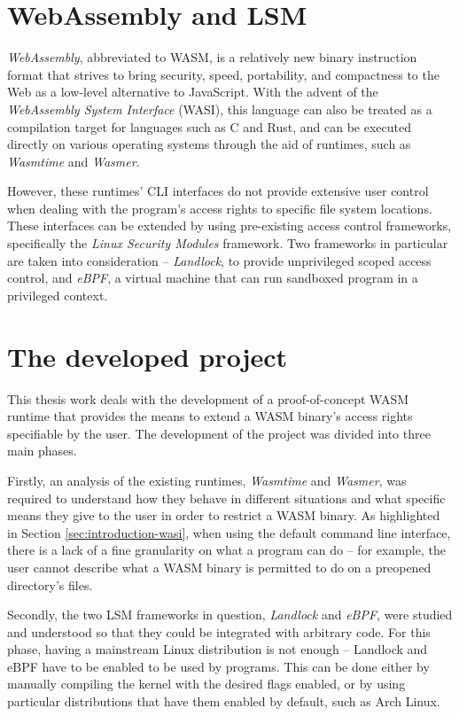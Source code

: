 \section{WebAssembly and LSM}

\textit{WebAssembly}, abbreviated to WASM, is a relatively new binary instruction format that
strives to bring security, speed, portability, and compactness to the Web
as a low-level alternative to JavaScript.
With the advent of the \textit{WebAssembly System Interface} (WASI),
this language can also be treated as a compilation target for languages such as C and Rust,
and can be executed directly on various operating systems
through the aid of runtimes, such as \textit{Wasmtime} and \textit{Wasmer}.

However, these runtimes' CLI interfaces do not provide extensive user control
when dealing with the program's access rights to specific file system locations.
These interfaces can be extended by using pre-existing access control frameworks,
specifically the \textit{Linux Security Modules} framework.
Two frameworks in particular are taken into consideration -- \textit{Landlock},
to provide unprivileged scoped access control, and \textit{eBPF}, a virtual
machine that can run sandboxed program in a privileged context.

\section{The developed project}

This thesis work deals with the development of a proof-of-concept WASM runtime that
provides the means to extend a WASM binary's access rights specifiable by the user.
The development of the project was divided into three main phases.

Firstly, an analysis of the existing runtimes, \textit{Wasmtime} and \textit{Wasmer},
was required to understand how they behave in different situations and what
specific means they give to the user in order to restrict a WASM binary.
As highlighted in Section \ref{sec:introduction-wasi}, when using the default command line
interface, there is a lack of a fine granularity on what a program can do -- for example,
the user cannot describe what a WASM binary is permitted to do on a preopened directory's files.

Secondly, the two LSM frameworks in question, \textit{Landlock} and \textit{eBPF}, were studied and understood
so that they could be integrated with arbitrary code.
For this phase, having a mainstream Linux distribution is not enough -- Landlock and eBPF have to be enabled
to be used by programs. This can be done either by manually compiling the kernel with the desired
flags enabled, or by using particular distributions that have them enabled by default, such as Arch Linux.

